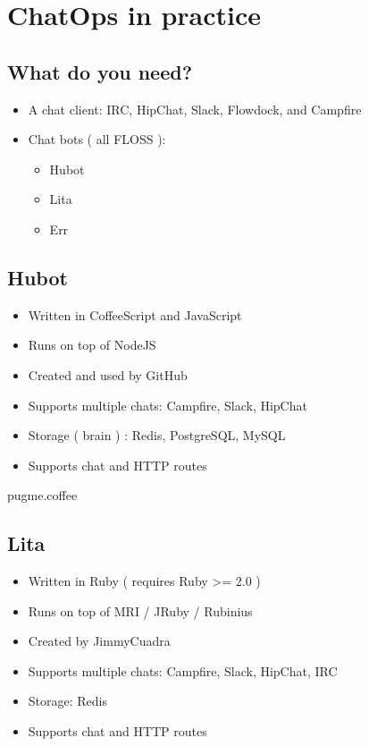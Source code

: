 \documentclass[
paper=128mm:96mm, %
fontsize=11pt, %
pagesize, %
parskip=half-, %
]{scrartcl} %
\theoremstyle{mythmstyle} %
\begin{document}
\clearpage


\section{ChatOps in practice}
\subsection{What do you need?}

\begin{itemize}
  \item A chat client: IRC, HipChat, Slack, Flowdock, and Campfire
  \item Chat bots ( all FLOSS ):
  \begin{itemize}
    \item Hubot
    \item Lita
    \item Err
  \end{itemize}
\end{itemize}
\clearpage


\subsection{Hubot}
\begin{itemize}
\item Written in CoffeeScript and JavaScript
\item Runs on top of NodeJS
\item Created and used by GitHub
\item Supports multiple chats: Campfire, Slack, HipChat
\item Storage ( brain ) : Redis, PostgreSQL, MySQL
\item Supports chat and HTTP routes
\end{itemize}
\clearpage


pugme.coffee
\clearpage


\subsection{Lita}
\begin{itemize}
\item Written in Ruby ( requires Ruby >= 2.0 )
\item Runs on top of MRI / JRuby / Rubinius
\item Created by JimmyCuadra
\item Supports multiple chats: Campfire, Slack, HipChat, IRC
\item Storage: Redis
\item Supports chat and HTTP routes
\end{itemize}
\clearpage
\end{document}
